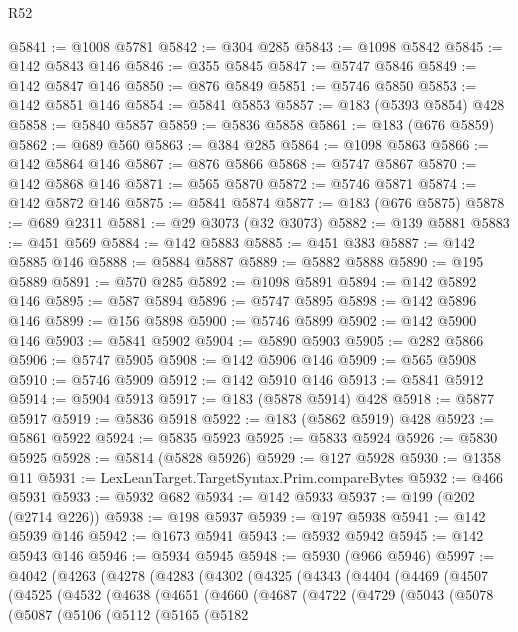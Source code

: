 \begin{lexlean}{R52}
\begin{coremodule}
{{{{{{{{{{{{{{{{{{{{{{{{{{{{{{{{{{{{{{{{{{{{{{{{{{{{{{{{{{{{{{{{{{{{{{{{{{{{{{{{{{{{{{{{{{{{{{{{{{{{{{{{{{{{{{{{{{{{{{{{{{{{{{{{{{{{{{{{{{{{{{{{{{{{{{{{{{{{{{{{{{{{{{{{{{{{{{{{{{{{{{{{{{{{{{{{{{{{{{@5841 := @1008 @5781
@5842 := @304 @285
@5843 := @1098 @5842
@5845 := @142 @5843 @146
@5846 := @355 @5845
@5847 := @5747 @5846
@5849 := @142 @5847 @146
@5850 := @876 @5849
@5851 := @5746 @5850
@5853 := @142 @5851 @146
@5854 := @5841 @5853
@5857 := @183 (@5393 @5854) @428
@5858 := @5840 @5857
@5859 := @5836 @5858
@5861 := @183 (@676 @5859)
@5862 := @689 @560
@5863 := @384 @285
@5864 := @1098 @5863
@5866 := @142 @5864 @146
@5867 := @876 @5866
@5868 := @5747 @5867
@5870 := @142 @5868 @146
@5871 := @565 @5870
@5872 := @5746 @5871
@5874 := @142 @5872 @146
@5875 := @5841 @5874
@5877 := @183 (@676 @5875)
@5878 := @689 @2311
@5881 := @29 @3073 (@32 @3073)
@5882 := @139 @5881
@5883 := @451 @569
@5884 := @142 @5883
@5885 := @451 @383
@5887 := @142 @5885 @146
@5888 := @5884 @5887
@5889 := @5882 @5888
@5890 := @195 @5889
@5891 := @570 @285
@5892 := @1098 @5891
@5894 := @142 @5892 @146
@5895 := @587 @5894
@5896 := @5747 @5895
@5898 := @142 @5896 @146
@5899 := @156 @5898
@5900 := @5746 @5899
@5902 := @142 @5900 @146
@5903 := @5841 @5902
@5904 := @5890 @5903
@5905 := @282 @5866
@5906 := @5747 @5905
@5908 := @142 @5906 @146
@5909 := @565 @5908
@5910 := @5746 @5909
@5912 := @142 @5910 @146
@5913 := @5841 @5912
@5914 := @5904 @5913
@5917 := @183 (@5878 @5914) @428
@5918 := @5877 @5917
@5919 := @5836 @5918
@5922 := @183 (@5862 @5919) @428
@5923 := @5861 @5922
@5924 := @5835 @5923
@5925 := @5833 @5924
@5926 := @5830 @5925
@5928 := @5814 (@5828 @5926)
@5929 := @127 @5928
@5930 := @1358 @11
@5931 := LexLeanTarget.TargetSyntax.Prim.compareBytes
@5932 := @466 @5931
@5933 := @5932 @682
@5934 := @142 @5933
@5937 := @199 (@202 (@2714 @226))
@5938 := @198 @5937
@5939 := @197 @5938
@5941 := @142 @5939 @146
@5942 := @1673 @5941
@5943 := @5932 @5942
@5945 := @142 @5943 @146
@5946 := @5934 @5945
@5948 := @5930 (@966 @5946)
@5997 := @4042
    (@4263
      (@4278
        (@4283
          (@4302
            (@4325
              (@4343
                (@4404
                  (@4469
                    (@4507
                      (@4525
                        (@4532
                          (@4638
                            (@4651
                              (@4660
                                (@4687
                                  (@4722
                                    (@4729
                                      (@5043
                                        (@5078
                                          (@5087
                                            (@5106
                                              (@5112
                                                (@5165
                                                  (@5182
}}}}}}}}}}}}}}}}}}}}}}}}}}}}}}}}}}}}}}}}}}}}}}}}}}}}}}}}}}}}}}}}}}}}}}}}}}}}}}}}}}}}}}}}}}}}}}}}}}}}}}}}}}}}}}}}}}}}}}}}}}}}}}}}}}}}}}}}}}}}}}}}}}}}}}}}}}}}}}}}}}}}}}}}}}}}}}}}}}}}}}}}}}}}}}}}}}}}}}
\end{coremodule}
\end{lexlean}
